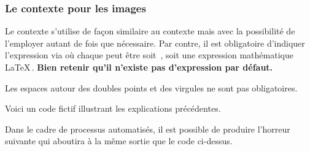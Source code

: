 \documentclass[10pt, a4paper]{article}
\begin{document}

\subsubsection{Le contexte  pour les images}

Le contexte  s'utilise de façon similaire au contexte  mais avec la possibilité de l'employer autant de fois que nécessaire.
Par contre, il est obligatoire d'indiquer l'expression  via
où chaque  peut être soit \,, soit une expression mathématique \LaTeX\,.
\textbf{Bien retenir qu'il n'existe pas d'expression par défaut.}




\begin{tdocnote}
    Les espaces autour des doubles points et des virgules ne sont pas obligatoires.
\end{tdocnote}




Voici un code fictif illustrant les explications précédentes.



Dans le cadre de processus automatisés, il est possible de produire l'horreur suivante qui aboutira à la même sortie que le code ci-dessus.

\end{document}
